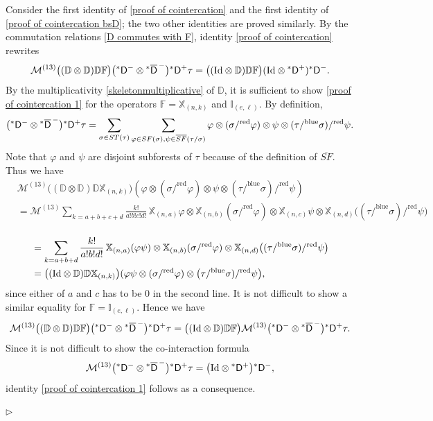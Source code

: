 \documentclass[10pt, reqno]{amsart}
\numberwithin{subsection}{section}
\numberwithin{subsubsection}{subsection}
\numberwithin{equation}{section} %
\newenvironment{Dem}[1][\unskip]{%
    \begin{list}{\hspace{1.15cm}{\sf \textbf{{\small Proof #1 --}}}}{%
        \setlength{\topsep}{0pt}%
        \setlength{\leftmargin}{0pt}%
        \setlength{\rightmargin}{0pt}%
        \setlength{\listparindent}{0pt}%
        \setlength{\itemindent}{0pt}%
        \setlength{\parsep}{0pt}%
        \addtolength{\leftmargin}{0pt}%
        \addtolength{\rightmargin}{0pt}%
    } \item }{\hfill $\rhd$\end{list}\smallskip}
\theoremstyle{mystyle}
\theoremstyle{mystyle2}
\theoremstyle{mystyle3}
\newcommand{\iden}{\text{\rm Id}}
\newcommand{\bbF}{\mathbb{F}}
\newcommand{\bbD}{\mathbb{D}}
\newcommand\bbI{\mathbb{I}}
\newcommand{\bbX}{\mathbb{X}}
\newcommand{\mcM}{\mathcal{M}}
\begin{document}
\begin{Dem}
Consider the first identity of \eqref{proof of cointercation} and the first identity of \eqref{proof of cointercation bsD}; the two other identities are proved similarly. By the commutation relations \eqref{D commutes with F}, identity \eqref{proof of cointercation} rewrites
\begin{align}\label{proof of cointercation 1}
\mcM^{(13)}\big((\bbD\otimes\bbD)\bbD\bbF\big)
\big({^*}{\sf D}^-\otimes{^*}\overline{\sf D}^{\,-}\big){^*}{\sf D}^+\tau
= \big((\text{\rm Id}\otimes\bbD)\bbD\bbF\big)(\text{\rm Id}\otimes{^*}{\sf D}^+){^*}{\sf D}^-.
\end{align}
By the multiplicativity \eqref{skeletonmultiplicative} of $\bbD$, it is sufficient to show \eqref{proof of cointercation 1} for the operators $\bbF=\bbX_{(n,k)}$ and $\bbI_{(e,\ell)}$. By definition,
\begin{align*}
\big({^*}{\sf D}^-\otimes{^*}\overline{\sf D}^{\,-}\big){^*}{\sf D}^+\tau 
= \sum_{\sigma\in ST(\tau)}\sum_{\varphi\in SF(\sigma),\psi\in\overline{SF}(\tau/\sigma)}
\varphi\otimes(\sigma/^{\text{red}}\varphi)\otimes\psi\otimes(\tau/^{\text{blue}}\sigma)/^{\text{red}}\psi.
\end{align*}
Note that $\varphi$ and $\psi$ are disjoint subforests of $\tau$ because of the definition of $\overline{SF}$. Thus we have
\begin{align*}
&\mcM^{(13)}\big((\bbD\otimes\bbD)\bbD\bbX_{(n,k)}\big)
(\varphi\otimes(\sigma/^{\text{red}}\varphi)\otimes\psi\otimes(\tau/^{\text{blue}}\sigma)/^{\text{red}}\psi)\\
&=\mcM^{(13)}\sum_{k=a+b+c+d}\frac{k!}{a!b!c!d!} \, \bbX_{(n,a)}\varphi\otimes\bbX_{(n,b)}(\sigma/^{\text{red}}\varphi)
\otimes\bbX_{(n,c)}\psi\otimes\bbX_{(n,d)}\big((\tau/^{\text{blue}}\sigma)/^{\text{red}}\psi\big)   \\
\end{align*}

\begin{align*}
&=\sum_{k=a+b+d}\frac{k!}{a!b!d!} \, \bbX_{(n,a)}(\varphi\psi)
\otimes\bbX_{(n,b)}(\sigma/^{\text{red}}\varphi)\otimes\bbX_{(n,d)}\big((\tau/^{\text{blue}}\sigma)/^{\text{red}}\psi\big)   \\
&=\big((\text{\rm Id}\otimes\bbD)\bbD\bbX_{(n,k)}\big)
(\varphi\psi\otimes(\sigma/^{\text{red}}\varphi)\otimes\big(\tau/^{\text{blue}}\sigma)/^{\text{red}}\psi\big),
\end{align*}
since either of $a$ and $c$ has to be $0$ in the second line.
It is not difficult to show a similar equality for $\bbF=\bbI_{(e,\ell)}$.
Hence we have
\begin{align*}
\mcM^{(13)}\big((\bbD\otimes\bbD)\bbD\bbF\big)
\big({^*}{\sf D}^-\otimes{^*}\overline{\sf D}^{\,-}\big){^*}{\sf D}^+\tau
= \big((\text{\rm Id}\otimes\bbD)\bbD\bbF\big) \mcM^{(13)}\big({^*}{\sf 
D}^-\otimes{^*}\overline{\sf D}^{\,-}\big){^*}{\sf D}^+\tau.
\end{align*}
Since it is not difficult to show the co-interaction formula
$$
\mcM^{(13)}\big({^*}{\sf D}^-\otimes{^*}\overline{\sf D}^{\,-}\big){^*}{\sf D}^+\tau
= \big(\iden\otimes{^*}{\sf D}^+\big){^*}{\sf D}^-,
$$
identity \eqref{proof of cointercation 1} follows as a consequence.


\end{Dem}
\end{document}
